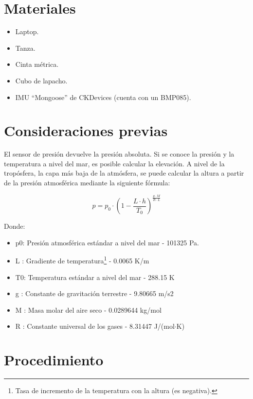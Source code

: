 \documentclass[main]{subfiles}
\begin{document}
\newpage
\section{Materiales}
\label{sec:materiales}

\begin{itemize}
\item Laptop.
\item Tanza.
\item Cinta m\'etrica.
\item Cubo de lapacho.
\item IMU ``Mongoose'' de CKDevices (cuenta con un BMP085).
\end{itemize}

\section{Consideraciones previas}
\label{consideraciones}

El sensor de presi\'on devuelve la presi\'on absoluta. Si se conoce la presi\'on y la temperatura a nivel del mar, es posible calcular la elevaci\'on. A nivel de la trop\'osfera, la capa m\'as baja de la atm\'osfera, se puede calcular la altura a partir de la presi\'on atmosf\'erica mediante la siguiente f\'ormula\cite{bib:alt-press}:

\begin{equation}
  \label{eq:press-alt}
  p = p_0 \cdot \left(1 - \frac{L \cdot h}{T_0} \right)^\frac{g \cdot M}{R \cdot L}
\end{equation}

Donde:
\begin{itemize}
\item p0: 	Presi\'on atmosf\'erica est\'andar a nivel del mar -	101325 Pa.
\item L :	Gradiente de temperatura\footnote{Tasa de incremento de la temperatura con la altura (es negativa).} -	0.0065 K/m
\item T0:	Temperatura est\'andar a nivel del mar -	288.15 K
\item g :	Constante de gravitaci\'on terrestre -	9.80665 m/s2
\item M :	Masa molar del aire seco -	0.0289644 kg/mol
\item R :	Constante universal de los gases - 	8.31447 J/(mol$\cdot$K)
\end{itemize}


\section{Procedimiento}
\label{sec:procedimiento}
\end{document}
